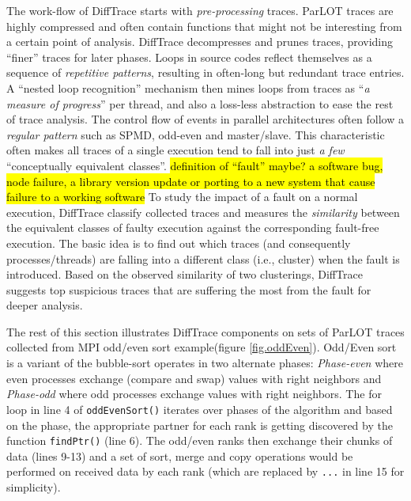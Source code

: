 The work-flow of DiffTrace starts with \textit{pre-processing} traces. ParLOT traces are highly compressed and often contain functions that might not be interesting from a certain point of analysis. DiffTrace decompresses and prunes traces, providing ``finer'' traces for later phases.  
%
Loops in source codes reflect themselves as a sequence of \textit{repetitive patterns}, resulting in often-long but redundant trace entries. A ``nested loop  recognition'' mechanism then mines loops from traces as ``\textit{a measure of progress}'' per thread, and also a loss-less abstraction to ease the rest of trace analysis.
%
The control flow of events in parallel architectures often follow a \textit{regular pattern} such as SPMD, odd-even and master/slave. This characteristic often makes all traces of a single execution tend to fall into just \textit{a few} ``conceptually equivalent classes''. 
%
%
\hl{definition of ``fault'' maybe? a software bug, node failure, a library version update or porting to a new system that cause failure to a working software }
To study the impact of a fault on a normal execution, DiffTrace classify collected traces and measures the \textit{similarity} between the equivalent classes of faulty execution against the corresponding fault-free execution.
%
The basic idea is to find out which traces (and consequently processes/threads) are falling into a different class (i.e., cluster) when the fault is introduced.
%
Based on the observed similarity of two clusterings, DiffTrace suggests top suspicious traces that are suffering the most from the fault for deeper analysis.
%

The rest of this section illustrates DiffTrace components on sets of ParLOT traces collected from MPI odd/even sort example(figure \ref{fig.oddEven}).
Odd/Even sort is a variant of the bubble-sort operates in two alternate phases: \textit{Phase-even} where even processes exchange (compare and swap) values with right neighbors and \textit{Phase-odd} where odd processes exchange values with right neighbors. The for loop in line 4 of \texttt{oddEvenSort()} iterates over phases of the algorithm and based on the phase, the appropriate partner for each rank is getting discovered by the function \texttt{findPtr()} (line 6). The odd/even ranks then exchange their chunks of data (lines 9-13) and a set of sort, merge and copy operations would be performed on received data by each rank (which are replaced by \texttt{...} in line 15 for simplicity).

